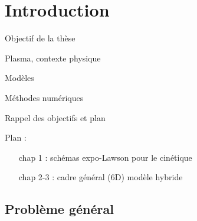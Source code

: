
\setcounter{chapter}{-1}
\chapter{Introduction}



Objectif de la thèse

Plasma, contexte physique

Modèles

Méthodes numériques

Rappel des objectifs et plan

Plan :
\begin{itemize}
  \item[chap 1 :] schémas expo-Lawson pour le cinétique
  \item[chap 2-3 :] cadre général (6D) modèle hybride
\end{itemize}

\section{Problème général}

